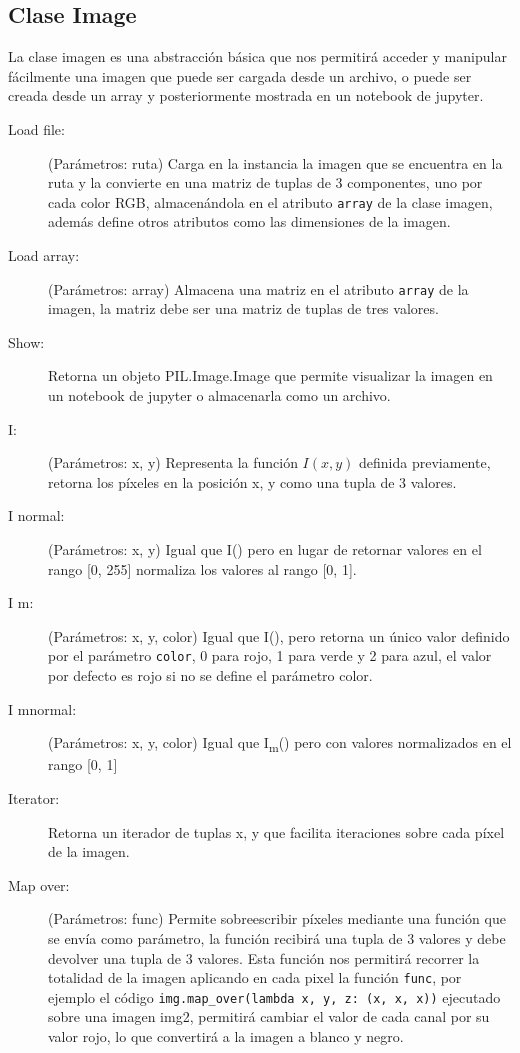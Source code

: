 \documentclass[letter]{article}
\begin{document}
\subsection{Clase Image}
\label{sec:org8d4e6f3}
La clase imagen es una abstracción básica que nos permitirá acceder y manipular
fácilmente una imagen que puede ser cargada desde un archivo, o puede ser creada
desde un array y posteriormente mostrada en un notebook de jupyter.

\begin{description}
\item[{Load file:}] (Parámetros: ruta) Carga en la instancia la imagen que se
encuentra en la ruta y la convierte en una matriz de tuplas de 3 componentes,
uno por cada color RGB, almacenándola en el atributo \texttt{array} de la clase
imagen, además define otros atributos como las dimensiones de la imagen.

\item[{Load array:}] (Parámetros: array) Almacena una matriz en el atributo \texttt{array}
de la imagen, la matriz debe ser una matriz de tuplas de tres valores.

\item[{Show:}] Retorna un objeto PIL.Image.Image que permite visualizar la imagen en
un notebook de jupyter o almacenarla como un archivo.

\item[{I:}] (Parámetros: x, y) Representa la función \(I(x, y)\) definida previamente,
retorna los píxeles en la posición x, y como una tupla de 3 valores.

\item[{I normal:}] (Parámetros: x, y) Igual que I() pero en lugar de retornar
valores en el rango [0, 255] normaliza los valores al rango [0, 1].

\item[{I m:}] (Parámetros: x, y, color) Igual que I(), pero retorna un único valor
definido por el parámetro \texttt{color}, 0 para rojo, 1 para verde y 2 para azul, el
valor por defecto es rojo si no se define el parámetro color.

\item[{I mnormal:}] (Parámetros: x, y, color) Igual que I\textsubscript{m}() pero con valores
normalizados en el rango [0, 1]

\item[{Iterator:}] Retorna un iterador de tuplas x, y que facilita iteraciones
sobre cada píxel de la imagen.

\item[{Map over:}] (Parámetros: func) Permite sobreescribir píxeles mediante una
función que se envía como parámetro, la función recibirá una tupla de 3
valores y debe devolver una tupla de 3 valores. Esta función nos permitirá
recorrer la totalidad de la imagen aplicando en cada pixel la función \texttt{func},
por ejemplo el código \texttt{img.map\_over(lambda x, y, z: (x, x, x))} ejecutado
sobre una imagen img2, permitirá cambiar el valor de cada canal por su valor
rojo, lo que convertirá a la imagen a blanco y negro.
\end{description}
\end{document}
